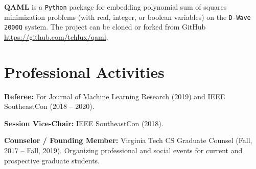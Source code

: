 \documentclass[12pt]{article}
\begin{document}
\textbf{QAML} is a \texttt{Python} package for embedding polynomial sum of
squares minimization problems (with real, integer, or boolean variables) on
the \texttt{D-Wave 2000Q} system.
The project can be cloned or forked from GitHub
\url{https://github.com/tchlux/qaml}.


\section*{Professional Activities}

\textbf{Referee:} For
Journal of Machine Learning Research (2019) and
IEEE SoutheastCon (2018 -- 2020).

\textbf{Session Vice-Chair:} IEEE SoutheastCon (2018).

\textbf{Counselor / Founding Member:} Virginia Tech CS Graduate Counsel 
(Fall, 2017 -- Fall, 2019).
Organizing professional and social events for
current and prospective graduate students.
\end{document}

